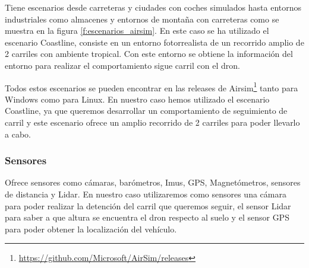 Tiene escenarios desde carreteras y ciudades con coches simulados hasta entornos industriales como almacenes y entornos de montaña con carreteras como se 
muestra en la figura \ref{f:escenarios_airsim}. En este caso
se ha utilizado el escenario Coastline, consiste en un entorno fotorrealista de un recorrido amplio de 2 carriles con ambiente tropical. Con este entorno se obtiene la
información del entorno para realizar el comportamiento sigue carril con el dron. 

Todos estos escenarios se pueden encontrar en las releases de Airsim\footnote{\url{https://github.com/Microsoft/AirSim/releases}} tanto para Windows como para Linux.
En nuestro caso hemos utilizado el escenario Coastline, ya que queremos desarrollar un comportamiento de seguimiento de carril y este escenario ofrece un amplio recorrido de 2 carriles para poder llevarlo
a cabo.

\subsubsection{Sensores}
\label{sec:airsim}
Ofrece sensores como cámaras, barómetros, Imus, GPS, Magnetómetros, sensores de distancia y Lidar.
En nuestro caso utilizaremos como sensores una cámara para poder realizar la detención del carril 
que queremos seguir, el sensor Lidar para saber a que altura se encuentra el dron respecto al suelo y el sensor
GPS para poder obtener la localización del vehículo. 



